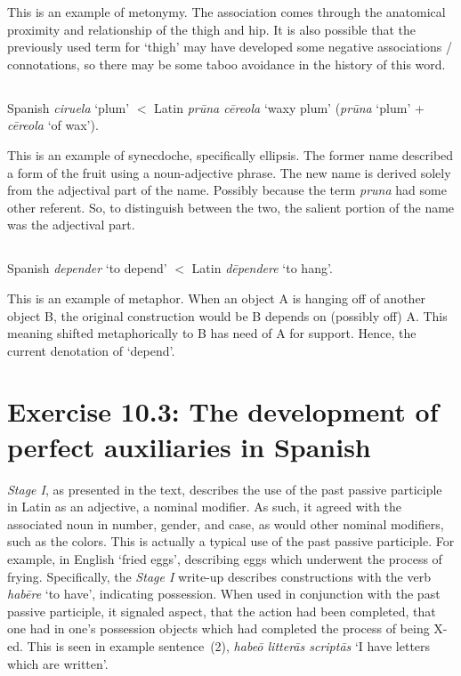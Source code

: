 \documentclass[12pt]{article}
\begin{document}
This is an example of metonymy. The association comes through the anatomical proximity and relationship of the thigh and hip. It is also possible that the previously used term for `thigh' may have developed some negative associations / connotations, so there may be some taboo avoidance in the history of this word.

\addtocounter{subsection}{+1}
\subsection{}

Spanish  {\it ciruela} `plum' $<$ Latin {\it pr\=una c\=ereola} `waxy plum' ({\it pr\=una} `plum' + {\it c\=ereola} `of wax').

This is an example of synecdoche, specifically ellipsis. The former name described a form of the fruit using a noun-adjective phrase. The new name is derived solely from the adjectival part of the name. Possibly because the term {\it pruna} had some other referent. So, to distinguish between the two, the salient portion of the name was the adjectival part.

\addtocounter{subsection}{+1}
\subsection{}

Spanish {\it depender} `to depend' $<$ Latin {\it d\=ependere} `to hang'.

This is an example of metaphor. When an object A is hanging off of another object B, the original construction would be B depends on (possibly off) A. This meaning shifted metaphorically to B has need of A for support. Hence, the current denotation of `depend'.

\section{Exercise 10.3: The development of perfect auxiliaries in Spanish}

{\it Stage I}, as presented in the text, describes the use of the past passive participle in Latin as an adjective, a nominal modifier. As such, it agreed with the associated noun in number, gender, and case, as would other nominal modifiers, such as the colors. This is actually a typical use of the past passive participle. For example, in English `fried eggs', describing eggs which underwent the process of frying. Specifically, the {\it Stage I} write-up describes constructions with the verb {\it hab\=ere} `to have', indicating possession. When used in conjunction with the past passive participle, it signaled aspect, that the action had been completed, that one had in one's possession objects which had completed the process of being X-ed. This is seen in example sentence~(2), {\it habe\=o litter\=as script\=as} `I have letters which are written'.
\end{document}
